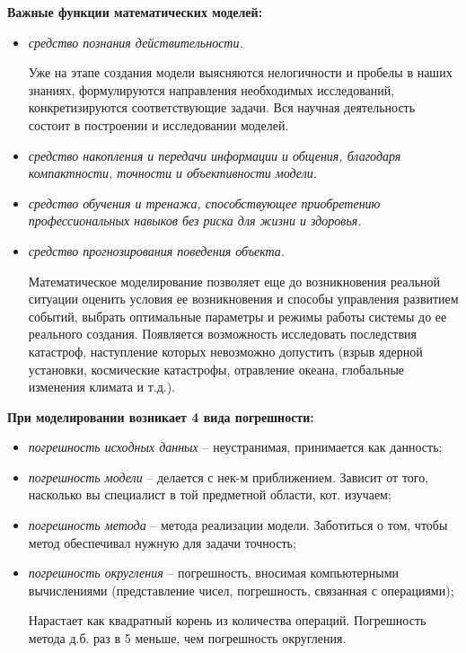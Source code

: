 \textbf{Важные функции математических моделей:}

\begin{itemize}[label*=--]
	\item \textit{средство познания действительности. }
	
	Уже на этапе создания модели выясняются нелогичности и пробелы в наших знаниях, формулируются направления необходимых исследований, конкретизируются соответствующие задачи. Вся научная деятельность состоит в построении и исследовании моделей.
	
	\item \textit{средство накопления и передачи информации и общения, благодаря компактности,
	точности и объективности модели.}
	
	\item \textit{средство обучения и тренажа, способствующее приобретению профессиональных
	навыков без риска для жизни и здоровья.}
	
	\item \textit{средство прогнозирования поведения объекта. }
	
	Математическое моделирование позволяет еще до возникновения реальной ситуации оценить условия ее возникновения и способы управления развитием событий, выбрать оптимальные параметры и режимы работы системы до ее реального создания. Появляется возможность исследовать последствия катастроф, наступление которых невозможно допустить (взрыв ядерной установки, космические катастрофы, отравление океана, глобальные изменения климата и т.д.).
\end{itemize}

\textbf{При моделировании возникает 4 вида погрешности:}

\begin{itemize}[label*=--]
	\item \textit{погрешность исходных данных} -- неустранимая, принимается как данность;
	
	\item \textit{погрешность модели} -- делается с нек-м приближением. Зависит от того, насколько вы специалист в той предметной области, кот. изучаем;
	
	\item \textit{погрешность метода} -- метода реализации модели. Заботиться о том, чтобы метод обеспечивал нужную для задачи точность;
	
	\item \textit{погрешность округления} -- погрешность, вносимая компьютерными вычислениями (представление чисел, погрешность, связанная с операциями);
	
	Нарастает как квадратный корень из количества операций. Погрешность метода д.б. раз в 5 меньше, чем погрешность округления.
\end{itemize}


